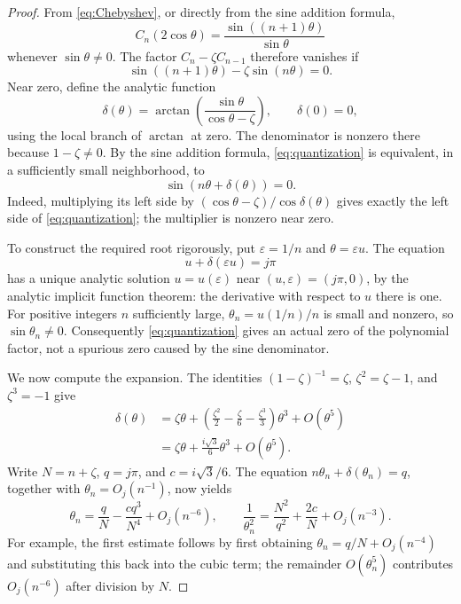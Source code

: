 \documentclass[11pt]{article}
\numberwithin{equation}{section}
\theoremstyle{definition}
\begin{document}
\begin{proof}
From \eqref{eq:Chebyshev}, or directly from the sine addition formula,
\[
 C_n(2\cos\theta)=\frac{\sin((n+1)\theta)}{\sin\theta}
\]
whenever $\sin\theta\neq0$.
The factor $C_n-\zeta C_{n-1}$ therefore vanishes if
\begin{equation}\label{eq:quantization}
 \sin((n+1)\theta)-\zeta\sin(n\theta)=0.
\end{equation}
Near zero, define the analytic function
\begin{equation}\label{eq:delta}
 \delta(\theta)=\arctan\left(\frac{\sin\theta}{\cos\theta-\zeta}\right),
 \qquad \delta(0)=0,
\end{equation}
using the local branch of $\arctan$ at zero.
The denominator is nonzero there because $1-\zeta\neq0$.
By the sine addition formula, \eqref{eq:quantization} is equivalent,
in a sufficiently small neighborhood, to
\[
 \sin(n\theta+\delta(\theta))=0.
\]
Indeed, multiplying its left side by
$(\cos\theta-\zeta)/\cos\delta(\theta)$ gives exactly the left side of
\eqref{eq:quantization}; the multiplier is nonzero near zero.

To construct the required root rigorously, put $\varepsilon=1/n$ and
$\theta=\varepsilon u$.  The equation
\[
 u+\delta(\varepsilon u)=j\pi
\]
has a unique analytic solution $u=u(\varepsilon)$ near
$(u,\varepsilon)=(j\pi,0)$, by the analytic implicit function theorem:
the derivative with respect to $u$ there is one.
For positive integers $n$ sufficiently large,
$\theta_n=u(1/n)/n$ is small and nonzero, so $\sin\theta_n\neq0$.
Consequently \eqref{eq:quantization} gives an actual zero of the polynomial
factor, not a spurious zero caused by the sine denominator.

We now compute the expansion.  The identities
$(1-\zeta)^{-1}=\zeta$, $\zeta^2=\zeta-1$, and $\zeta^3=-1$ give
\begin{align*}
 \delta(\theta)
  &=\zeta\theta+
       \left(\frac{\zeta^2}{2}-\frac\zeta6-\frac{\zeta^3}{3}\right)
           \theta^3+O(\theta^5)\\
  &=\zeta\theta+\frac{i\sqrt3}{6}\theta^3+O(\theta^5).
\end{align*}
Write $N=n+\zeta$, $q=j\pi$, and $c=i\sqrt3/6$.
The equation $n\theta_n+\delta(\theta_n)=q$, together with
$\theta_n=O_j(n^{-1})$, now yields
\[
 \theta_n=\frac qN-\frac{c q^3}{N^4}+O_j(n^{-6}),\qquad
 \frac1{\theta_n^2}=\frac{N^2}{q^2}+\frac{2c}{N}+O_j(n^{-3}).
\]
For example, the first estimate follows by first obtaining
$\theta_n=q/N+O_j(n^{-4})$ and substituting this back into the cubic term;
the remainder $O(\theta_n^5)$ contributes $O_j(n^{-6})$ after division
by $N$.


\end{proof}
\end{document}
